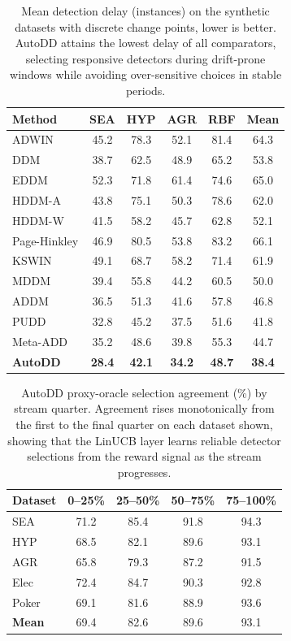\documentclass[conference]{IEEEtran}
\begin{document}
\begin{table}[!ht]
\centering
\caption{Mean detection delay (instances) on the synthetic datasets with discrete change points, lower is better. AutoDD attains the lowest delay of all comparators, selecting responsive detectors during drift-prone windows while avoiding over-sensitive choices in stable periods.}
\label{tab:delay_main}
\small
\begin{tabular}{|l|c|c|c|c|c|}
\hline
\textbf{Method} & \textbf{SEA} & \textbf{HYP} & \textbf{AGR} & \textbf{RBF} & \textbf{Mean} \\
\hline
ADWIN & 45.2 & 78.3 & 52.1 & 81.4 & 64.3 \\
DDM & 38.7 & 62.5 & 48.9 & 65.2 & 53.8 \\
EDDM & 52.3 & 71.8 & 61.4 & 74.6 & 65.0 \\
HDDM-A & 43.8 & 75.1 & 50.3 & 78.6 & 62.0 \\
HDDM-W & 41.5 & 58.2 & 45.7 & 62.8 & 52.1 \\
Page-Hinkley & 46.9 & 80.5 & 53.8 & 83.2 & 66.1 \\
KSWIN & 49.1 & 68.7 & 58.2 & 71.4 & 61.9 \\
MDDM & 39.4 & 55.8 & 44.2 & 60.5 & 50.0 \\
ADDM & 36.5 & 51.3 & 41.6 & 57.8 & 46.8 \\
PUDD & 32.8 & 45.2 & 37.5 & 51.6 & 41.8 \\
Meta-ADD & 35.2 & 48.6 & 39.8 & 55.3 & 44.7 \\
\textbf{AutoDD} & \textbf{28.4} & \textbf{42.1} & \textbf{34.2} & \textbf{48.7} & \textbf{38.4} \\
\hline
\end{tabular}
\end{table}


\begin{table}[!ht]
\centering
\caption{AutoDD proxy-oracle selection agreement (\%) by stream quarter. Agreement rises monotonically from the first to the final quarter on each dataset shown, showing that the LinUCB layer learns reliable detector selections from the reward signal as the stream progresses.}
\label{tab:conv_main}
\small
\begin{tabular}{|l|c|c|c|c|}
\hline
\textbf{Dataset} & \textbf{0--25\%} & \textbf{25--50\%} & \textbf{50--75\%} & \textbf{75--100\%} \\
\hline
SEA   & 71.2 & 85.4 & 91.8 & 94.3 \\
HYP   & 68.5 & 82.1 & 89.6 & 93.1 \\
AGR   & 65.8 & 79.3 & 87.2 & 91.5 \\
Elec  & 72.4 & 84.7 & 90.3 & 92.8 \\
Poker & 69.1 & 81.6 & 88.9 & 93.6 \\
\textbf{Mean} & 69.4 & 82.6 & 89.6 & 93.1 \\
\hline
\end{tabular}
\end{table}
\end{document}
